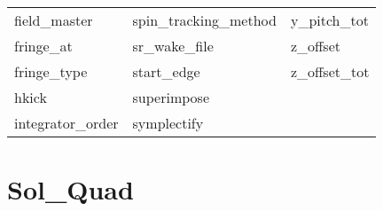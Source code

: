 \begin{tabular}{lll}
field_master                & spin_tracking_method        & y_pitch_tot                 \\
fringe_at                   & sr_wake_file                & z_offset                    \\
fringe_type                 & start_edge                  & z_offset_tot                \\
hkick                       & superimpose                 &                             \\
integrator_order            & symplectify                 &                             \\
 \bottomrule
 \end{tabular}
 \vfill
 
 \section{Sol_Quad}
 \label{s:list.sol.quad}
 
